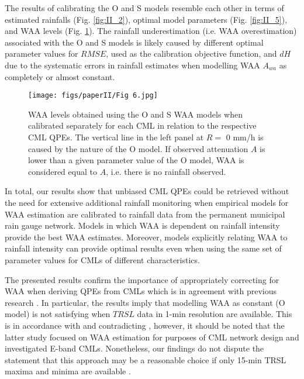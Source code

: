\documentclass{ctuthesis}\usepackage[]{graphicx}\usepackage[]{color}
\begin{document}
The results of calibrating the O and S models resemble each other in terms of estimated rainfalls (Fig. \ref{fig:II_2}), optimal model parameters (Fig. \ref{fig:II_5}), and WAA levels (Fig. \ref{fig:II_6}). The rainfall underestimation (i.e. WAA overestimation) associated with the O and S models is likely caused by different optimal parameter values for $RMSE$, used as the calibration objective function, and $dH$ due to the systematic errors in rainfall estimates when modelling WAA $A_{wa}$ as completely or almost constant.

\begin{figure}[h]
\begin{center}
\texttt{[image: figs/paperII/Fig 6.jpg]}
\caption{WAA levels obtained using the O and S WAA models when calibrated separately for each CML in relation to the respective CML QPEs. The vertical line in the left panel at $R =$ 0 mm/h is caused by the nature of the O model. If observed attenuation $A$ is lower than a given parameter value of the O model, WAA is considered equal to $A$, i.e. there is no rainfall observed.} 
\label{fig:II_6}
\end{center}
\end{figure}

In total, our results show that unbiased CML QPEs could be retrieved without the need for extensive additional rainfall monitoring when empirical models for WAA estimation are calibrated to rainfall data from the permanent municipal rain gauge network. Models in which WAA is dependent on rainfall intensity provide the best WAA estimates. Moreover, models explicitly relating WAA to rainfall intensity can provide optimal results even when using the same set of parameter values for CMLs of different characteristics.

The presented results confirm the importance of appropriately correcting for WAA when deriving QPEs from CMLs which is in agreement with previous research \citep{chwalaCommercialMicrowaveLink2019}. In particular, the results imply that modelling WAA as constant (O model) is not satisfying when $TRSL$ data in 1-min resolution are available. This is in accordance with \cite{pastorekCommercialMicrowaveLinks2019, fenclQuantifyingWetAntenna2019} and contradicting \cite{ostrometzkyWetAntennaEffectFactor2018}, however, it should be noted that the latter study focused on WAA estimation for purposes of CML network design and investigated E-band CMLs. Nonetheless, our findings do not dispute the statement that this approach may be a reasonable choice if only 15-min TRSL maxima and minima are available \citep{chwalaCommercialMicrowaveLink2019}.
\end{document}

